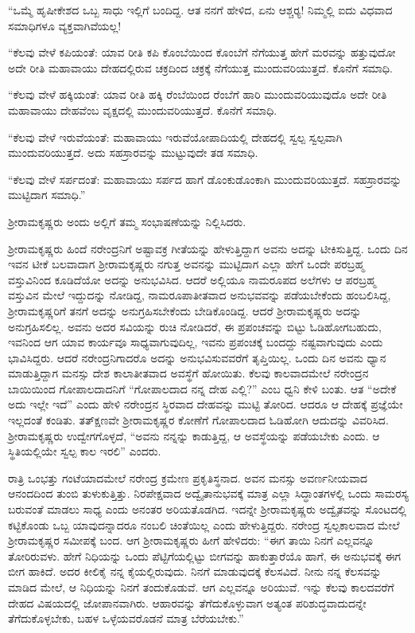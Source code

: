 \vskip 1pt

“ಒಮ್ಮೆ ಹೃಷೀಕೇಶದ ಒಬ್ಬ ಸಾಧು ಇಲ್ಲಿಗೆ ಬಂದಿದ್ದ. ಆತ ನನಗೆ ಹೇಳಿದ, ಏನು ಆಶ್ಚರ‍್ಯ! ನಿಮ್ಮಲ್ಲಿ ಐದು ವಿಧವಾದ ಸಮಾಧಿಗಳೂ ವ್ಯಕ್ತವಾಗಿವೆಯಲ್ಲ!

\vskip 1pt

“ಕೆಲವು ವೇಳೆ ಕಪಿಯಂತೆ: ಯಾವ ರೀತಿ ಕಪಿ ಕೊಂಬೆಯಿಂದ ಕೊಂಬೆಗೆ ನೆಗೆಯುತ್ತ ಹೇಗೆ ಮರವನ್ನು ಹತ್ತುವುದೋ ಅದೇ ರೀತಿ ಮಹಾವಾಯು ದೇಹದಲ್ಲಿರುವ ಚಕ್ರದಿಂದ ಚಕ್ರಕ್ಕೆ ನೆಗೆಯುತ್ತ ಮುಂದುವರಿಯುತ್ತದೆ. ಕೊನೆಗೆ ಸಮಾಧಿ.

\vskip 1pt

“ಕೆಲವು ವೇಳೆ ಹಕ್ಕಿಯಂತೆ: ಯಾವ ರೀತಿ ಹಕ್ಕಿ ರೆಂಬೆಯಿಂದ ರೆಂಬೆಗೆ ಹಾರಿ ಮುಂದುವರಿಯುವುದೊ ಅದೇ ರೀತಿ ಮಹಾವಾಯು ದೇಹವೆಂಬ ವೃಕ್ಷದಲ್ಲಿ ಮುಂದುವರಿಯುತ್ತದೆ. ಕೊನೆಗೆ ಸಮಾಧಿ.

\vskip 1pt

“ಕೆಲವು ವೇಳೆ ಇರುವೆಯಂತೆ: ಮಹಾವಾಯು ಇರುವೆಯೋಪಾದಿಯಲ್ಲಿ ದೇಹದಲ್ಲಿ ಸ್ವಲ್ಪ ಸ್ವಲ್ಪವಾಗಿ ಮುಂದುವರಿಯುತ್ತದೆ. ಅದು ಸಹಸ್ರಾರವನ್ನು ಮುಟ್ಟುವುದೇ ತಡ ಸಮಾಧಿ.

“ಕೆಲವು ವೇಳೆ ಸರ್ಪದಂತೆ: ಮಹಾವಾಯು ಸರ್ಪದ ಹಾಗೆ ಡೊಂಕುಡೊಂಕಾಗಿ ಮುಂದುವರಿಯುತ್ತದೆ. ಸಹಸ್ರಾರವನ್ನು ಮುಟ್ಟಿದಾಗ ಸಮಾಧಿ.”

ಶ‍್ರೀರಾಮಕೃಷ್ಣರು ಅಂದು ಅಲ್ಲಿಗೆ ತಮ್ಮ ಸಂಭಾಷಣೆಯನ್ನು ನಿಲ್ಲಿಸಿದರು.

ಶ‍್ರೀರಾಮಕೃಷ್ಣರು ಹಿಂದೆ ನರೇಂದ್ರನಿಗೆ ಅಷ್ಟಾವಕ್ರ ಗೀತೆಯನ್ನು ಹೇಳುತ್ತಿದ್ದಾಗ ಅವನು ಅದನ್ನು ಟೀಕಿಸುತ್ತಿದ್ದ. ಒಂದು ದಿನ ಇವನ ಟೀಕೆ ಬಲವಾದಾಗ ಶ‍್ರೀರಾಮಕೃಷ್ಣರು ನಗುತ್ತ ಅವನನ್ನು ಮುಟ್ಟಿದಾಗ ಎಲ್ಲಾ ಹೇಗೆ ಒಂದೇ ಪರಬ್ರಹ್ಮ ವಸ್ತುವಿನಿಂದ ಕೂಡಿದೆಯೋ ಅದನ್ನು ಅನುಭವಿಸಿದ. ಆದರೆ ಅಲ್ಲಿಯೂ ನಾಮರೂಪದ ಅಲೆಗಳು ಆ ಪರಬ್ರಹ್ಮ ವಸ್ತುವಿನ ಮೇಲೆ ಇದ್ದುದನ್ನು ನೋಡಿದ್ದ, ನಾಮರೂಪಾತೀತವಾದ ಅನುಭವವನ್ನು ಪಡೆಯಬೇಕೆಂದು ಹಂಬಲಿಸಿದ್ದ, ಶ‍್ರೀರಾಮಕೃಷ್ಣರಿಗೆ ತನಗೆ ಅದನ್ನು ಅನುಗ್ರಹಿಸಬೇಕೆಂದು ಬೇಡಿಕೊಂಡಿದ್ದ. ಆದರೆ ಶ‍್ರೀರಾಮಕೃಷ್ಣರು ಅದನ್ನು ಅನುಗ್ರಹಿಸಲಿಲ್ಲ. ಅವನು ಅದರ ಸವಿಯನ್ನು ರುಚಿ ನೋಡಿದರೆ, ಈ ಪ್ರಪಂಚವನ್ನು ಬಿಟ್ಟು ಓಡಿಹೋಗಬಹುದು, ಇವನಿಂದ ಆಗ ಯಾವ ಕಾರ್ಯವೂ ಸಾಧ್ಯವಾಗುವುದಿಲ್ಲ, ಇವನು ಪ್ರಪಂಚಕ್ಕೆ ಬಂದದ್ದು ನಷ್ಟವಾಗುವುದು ಎಂದು ಭಾವಿಸಿದ್ದರು. ಆದರೆ ನರೇಂದ್ರನಿಗಾದರೊ ಅದನ್ನು ಅನುಭವಿಸುವವರೆಗೆ ತೃಪ್ತಿಯಿಲ್ಲ. ಒಂದು ದಿನ ಅವನು ಧ್ಯಾನ ಮಾಡುತ್ತಿದ್ದಾಗ ಮನಸ್ಸು ದೇಶ ಕಾಲಾತೀತವಾದ ಅವಸ್ಥೆಗೆ ಹೋಯಿತು. ಕೆಲವು ಕಾಲವಾದಮೇಲೆ ನರೇಂದ್ರನ ಬಾಯಿಯಿಂದ ಗೋಪಾಲದಾದನಿಗೆ “ಗೋಪಾಲದಾದ ನನ್ನ ದೇಹ ಎಲ್ಲಿ?” ಎಂಬ ಧ್ವನಿ ಕೇಳಿ ಬಂತು. ಆತ “ಅದೇಕೆ ಅದು ಇಲ್ಲೇ ಇದೆ” ಎಂದು ಹೇಳಿ ನರೇಂದ್ರನ ಸ್ಥಿರವಾದ ದೇಹವನ್ನು ಮುಟ್ಟಿ ತೋರಿದ. ಆದರೂ ಆ ದೇಹಕ್ಕೆ ಪ್ರಜ್ಞೆಯೇ ಇಲ್ಲದಂತೆ ಕಂಡಿತು. ತತ್‍ಕ್ಷಣವೇ ಶ‍್ರೀರಾಮಕೃಷ್ಣರ ಕೋಣೆಗೆ ಗೋಪಾಲದಾದ ಓಡಿಹೋಗಿ ಆದುದನ್ನು ವಿವರಿಸಿದ. ಶ‍್ರೀರಾಮಕೃಷ್ಣರು ಉದ್ವೇಗಗೊಳ್ಳದೆ, “ಅವನು ನನ್ನನ್ನು ಕಾಡುತ್ತಿದ್ದ, ಆ ಅವಸ್ಥೆಯನ್ನು ಪಡೆಯಬೇಕು ಎಂದು. ಆ ಸ್ಥಿತಿಯಲ್ಲಿಯೇ ಸ್ವಲ್ಪ ಕಾಲ ಇರಲಿ” ಎಂದರು.

ರಾತ್ರಿ ಒಂಭತ್ತು ಗಂಟೆಯಾದಮೇಲೆ ನರೇಂದ್ರ ಕ್ರಮೇಣ ಪ್ರಕೃತಿಸ್ಥನಾದ. ಅವನ ಮನಸ್ಸು ಅವರ್ಣನೀಯವಾದ ಆನಂದದಿಂದ ತುಂಬಿ ತುಳುಕುತ್ತಿತ್ತು. ನಿರಪೇಕ್ಷವಾದ ಅದ್ವೈತಾನುಭವಕ್ಕೆ ಮಾತ್ರ ಎಲ್ಲಾ ಸಿದ್ಧಾಂತಗಳಲ್ಲಿ ಒಂದು ಸಾಮರಸ್ಯ ಬರುವಂತೆ ಮಾಡಲು ಸಾಧ್ಯ ಎಂದು ಅನಂತರ ಅರಿಯತೊಡಗಿದ. ಇದನ್ನೇ ಶ‍್ರೀರಾಮಕೃಷ್ಣರು ಅದ್ವೈತವನ್ನು ಸೊಂಟದಲ್ಲಿ ಕಟ್ಟಿಕೊಂಡು ಒಬ್ಬ ಯಾವುದನ್ನಾದರೂ ನಂಬಲಿ ಚಿಂತೆಯಿಲ್ಲ ಎಂದು ಹೇಳುತ್ತಿದ್ದರು. ನರೇಂದ್ರ ಸ್ವಲ್ಪಕಾಲವಾದ ಮೇಲೆ ಶ‍್ರೀರಾಮಕೃಷ್ಣರ ಸಮೀಪಕ್ಕೆ ಬಂದ. ಆಗ ಶ‍್ರೀರಾಮಕೃಷ್ಣರು ಹೀಗೆ ಹೇಳಿದರು: “ಈಗ ತಾಯಿ ನಿನಗೆ ಎಲ್ಲವನ್ನೂ ತೋರಿರುವಳು. ಹೇಗೆ ನಿಧಿಯನ್ನು ಒಂದು ಪೆಟ್ಟಿಗೆಯಲ್ಲಿಟ್ಟು ಬೀಗವನ್ನು ಹಾಕುತ್ತಾರೆಯೊ ಹಾಗೆ, ಈ ಅನುಭವಕ್ಕೆ ಈಗ ಬೀಗ ಹಾಕಿದೆ. ಅದರ ಕೀಲಿಕೈ ನನ್ನ ಕೈಯಲ್ಲಿರುವುದು. ನಿನಗೆ ಮಾಡುವುದಕ್ಕೆ ಕೆಲಸವಿದೆ. ನೀನು ನನ್ನ ಕೆಲಸವನ್ನು ಮಾಡಿದ ಮೇಲೆ, ಆ ನಿಧಿಯನ್ನು ನಿನಗೆ ತಂದುಕೊಡುವೆ. ಆಗ ಎಲ್ಲವನ್ನೂ ಅರಿಯುವೆ. ಇನ್ನು ಕೆಲವು ಕಾಲದವರೆಗೆ ದೇಹದ ವಿಷಯದಲ್ಲಿ ಜೋಪಾನವಾಗಿರು. ಆಹಾರವನ್ನು ತೆಗೆದುಕೊಳ್ಳುವಾಗ ಅತ್ಯಂತ ಪರಿಶುದ್ಧವಾದುದನ್ನೇ ತೆಗೆದುಕೊಳ್ಳಬೇಕು, ಬಹಳ ಒಳ್ಳೆಯವರೊಡನೆ ಮಾತ್ರ ಬೆರೆಯಬೇಕು.”

